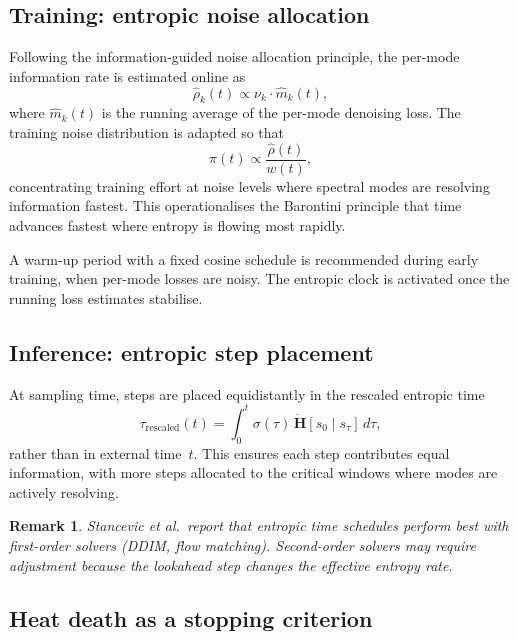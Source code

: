 \documentclass[11pt]{article}
\newtheorem{remark}{Remark}
\begin{document}
\subsection{Training: entropic noise allocation}
\label{sec:training_clock}

Following the information-guided noise allocation principle, the per-mode
information rate is estimated online as
\[\hat\rho_k(t) \propto \nu_k \cdot \hat{m}_k(t),\]
where \(\hat{m}_k(t)\) is the running average of the per-mode denoising loss.
The training noise distribution is adapted so that
\[\pi(t) \propto \frac{\hat\rho(t)}{w(t)},\]
concentrating training effort at noise levels where spectral modes are
resolving information fastest. This operationalises the Barontini principle
that time advances fastest where entropy is flowing most rapidly.

A warm-up period with a fixed cosine schedule is recommended during early
training, when per-mode losses are noisy. The entropic clock is activated
once the running loss estimates stabilise.

\subsection{Inference: entropic step placement}
\label{sec:inference_clock}

At sampling time, steps are placed equidistantly in the rescaled entropic time
\[\tau_{\mathrm{rescaled}}(t) = \int_0^t \sigma(\tau)\, \dot{\mathbf{H}}[s_0 \mid s_\tau]\, d\tau,\]
rather than in external time~\(t\). This ensures each step contributes equal
information, with more steps allocated to the critical windows where modes
are actively resolving.

\begin{remark}
Stancevic et al.~report that entropic time schedules perform best with
first-order solvers (DDIM, flow matching). Second-order solvers may require
adjustment because the lookahead step changes the effective entropy rate.
\end{remark}

\subsection{Heat death as a stopping criterion}
\label{sec:heat_death_clock}
\end{document}
